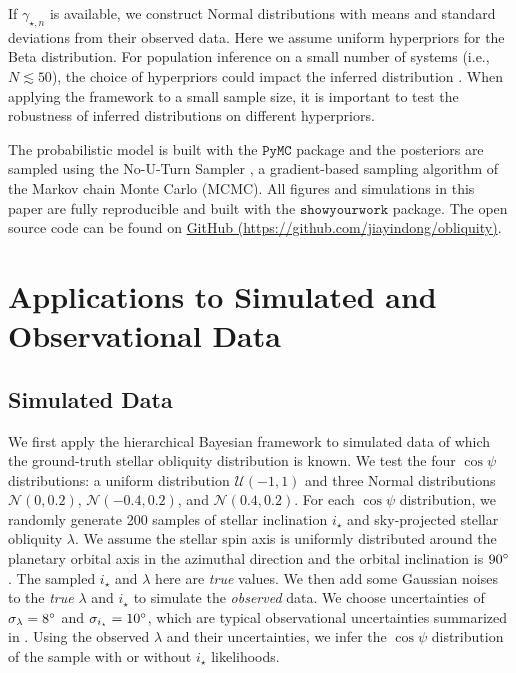 \documentclass[twocolumn,times]{aastex631}
\begin{document}
If $\gamma_{\star, n}$ is available, we construct Normal distributions with means and standard deviations from their observed data.
Here we assume uniform hyperpriors for the Beta distribution. For population inference on a small number of systems (i.e., $N \lesssim 50$), the choice of hyperpriors could impact the inferred distribution \citep{Nagpal22}. When applying the framework to a small sample size, it is important to test the robustness of inferred distributions on different hyperpriors.

The probabilistic model is built with the $\mathtt{PyMC}$ \citep[$\mathtt{v4.1.7}$;][]{pymc} package and the posteriors are sampled using the No-U-Turn Sampler \citep[NUTS;][]{Hoffman11}, a gradient-based sampling algorithm of the Markov chain Monte Carlo (MCMC). All figures and simulations in this paper are fully reproducible and built with the $\mathtt{showyourwork}$ package. The open source code can be found on \href{https://github.com/jiayindong/obliquity}{GitHub\,\faGithub\,(https://github.com/jiayindong/obliquity)}.

\section{Applications to Simulated and Observational Data}\label{sec:applications}

\subsection{Simulated Data}\label{subsec:sims}

We first apply the hierarchical Bayesian framework to simulated data of which the ground-truth stellar obliquity distribution is known. We test the four $\cos{\psi}$ distributions: a uniform distribution $\mathcal{U}(-1,1)$ and three Normal distributions $\mathcal{N}(0,0.2)$, $\mathcal{N}(-0.4,0.2)$, and $\mathcal{N}(0.4,0.2)$.
For each $\cos{\psi}$ distribution, we randomly generate 200 samples of stellar inclination $i_\star$ and sky-projected stellar obliquity $\lambda$. We assume the stellar spin axis is uniformly distributed around the planetary orbital axis in the azimuthal direction and the orbital inclination is $90\mbox{$^\circ$}$. 
The sampled $i_\star$ and $\lambda$ here are \emph{true} values. We then add some Gaussian noises to the \emph{true} $\lambda$ and $i_\star$ to simulate the \emph{observed} data. We choose uncertainties of $\sigma_{\lambda} = 8\mbox{$^\circ$}$ and $\sigma_{i_\star} = 10\mbox{$^\circ$}$, which are typical observational uncertainties summarized in \cite{Albrecht22}. Using the observed $\lambda$ and their uncertainties, we infer the $\cos{\psi}$ distribution of the sample with or without $i_\star$ likelihoods. 
\end{document}
